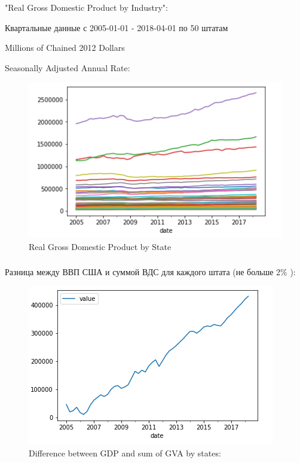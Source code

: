 \documentclass[c, dvipsnames]{beamer}  %
\begin{document}
\begin{frame}[shrink=5]
\frametitle{\insertsection} 
\framesubtitle{\insertsubsection}

"Real Gross Domestic Product by Industry":

Квартальные данные с 2005-01-01 - 2018-04-01 по 50 штатам 

Millions of Chained 2012 Dollars 

Seasonally Adjusted Annual Rate:  

\begin{figure}
	\centering
	\includegraphics[width=0.7\linewidth]{screenshot007}
	\caption{Real Gross Domestic Product by State}
	\label{fig:screenshot007}
\end{figure}


\end{frame}


\begin{frame}[shrink=5]
\frametitle{\insertsection} 
\framesubtitle{\insertsubsection}

Разница между ВВП США и суммой ВДС для каждого штата (не больше 2\% ):


\begin{figure}
	\centering
	\includegraphics[width=0.7\linewidth]{screenshot013}
	\caption{Difference between GDP and sum of GVA by states:}
	\label{fig:screenshot013}
\end{figure}

\end{frame}
\end{document}
